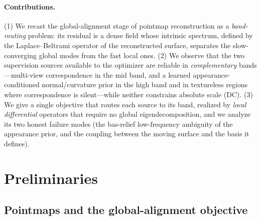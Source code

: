 \documentclass{article}
\begin{document}
\paragraph{Contributions.}
(1) We recast the global-alignment stage of pointmap reconstruction as a
\emph{band-routing} problem: its residual is a dense field whose intrinsic
spectrum, defined by the Laplace--Beltrami operator of the reconstructed
surface, separates the slow-converging global modes from the fast local ones.
(2) We observe that the two supervision sources available to the optimizer are
reliable in \emph{complementary} bands---multi-view correspondence in the mid
band, and a learned appearance-conditioned normal/curvature prior in the high
band and in textureless regions where correspondence is silent---while neither
constrains absolute scale (DC). (3) We give a single objective that routes each
source to its band, realized by \emph{local differential} operators that
require no global eigendecomposition, and we analyze its two honest failure
modes (the bas-relief low-frequency ambiguity of the appearance prior, and the
coupling between the moving surface and the basis it defines).

\section{Preliminaries}

\subsection{Pointmaps and the global-alignment objective}
\end{document}
